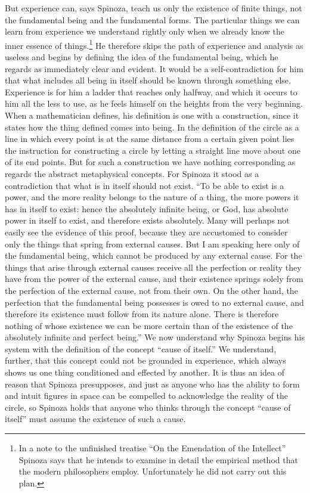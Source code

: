 \documentclass[12pt]{book}
\newcommand{\opage}[1]{\marginnote{\footnotesize\textit{[#1]}}}
\begin{document}
But experience can, says Spinoza, teach us only the existence of finite things, not the
fundamental being and the fundamental forms. The particular things we can learn from
experience we understand rightly only when we already know the inner essence of
things.\footnote{In a note to the unfinished treatise ``On the Emendation of the
Intellect'' Spinoza says that he intends to examine in detail the empirical method that
the modern philosophers employ. Unfortunately he did not carry out this plan.} He
therefore skips the path of experience and analysis as useless and begins by defining
the idea of the fundamental being, which he regards as immediately clear and evident.
It would be a self-contradiction for him that what includes all being in itself should
be known through something else. Experience is for him a ladder that reaches only
halfway, and which it occurs to him all the less to use, \opage{78}as he feels himself
on the heights from the very beginning. When a mathematician defines, his definition is
one with a construction, since it states how the thing defined comes into being. In the
definition of the circle as a line in which every point is at the same distance from a
certain given point lies the instruction for constructing a circle by letting a
straight line move about one of its end points. But for such a construction we have
nothing corresponding as regards the abstract metaphysical concepts. For Spinoza it
stood as a contradiction that what is in itself should not exist. ``To be able to exist
is a power, and the more reality belongs to the nature of a thing, the more powers it
has in itself to exist: hence the absolutely infinite being, or God, has absolute power
in itself to exist, and therefore exists absolutely. Many will perhaps not easily see
the evidence of this proof, because they are accustomed to consider only the things
that spring from external causes. But I am speaking here only of the fundamental being,
which cannot be produced by any external cause. For the things that arise through
external causes receive all the perfection or reality they have from the power of the
external cause, and their existence springs solely from the perfection of the external
cause, not from their own. On the other hand, the perfection that the fundamental being
possesses is owed to no external cause, and therefore its existence must follow from
its nature alone. There is therefore nothing of whose existence we can be more certain
than of the existence of the absolutely infinite and perfect being.'' We now understand
why Spinoza begins his system with the definition of the concept ``cause of itself.''
\opage{79}We understand, further, that this concept could not be grounded in
experience, which always shows us one thing conditioned and effected by another. It is
thus an idea of reason that Spinoza presupposes, and just as anyone who has the ability
to form and intuit figures in space can be compelled to acknowledge the reality of the
circle, so Spinoza holds that anyone who thinks through the concept ``cause of itself''
must assume the existence of such a cause.
\end{document}
